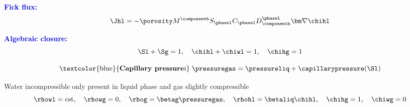 \documentclass[10 pt]{beamer}
\begin{document}
\begin{frame}
\begin{minipage}{.6\linewidth}
   \end{minipage}
\begin{minipage}{.3\linewidth}
\textcolor{blue}{\textbf {Fick flux:}}
\begin{equation*}
\Jhl = -\porosity M^{\componenth} S_{\phasel} C_{\phasel} D_{\componenth}^{\phasel} {\bm \nabla} \chihl
\end{equation*}
\end{minipage}
\hfill
\begin{minipage}{.6\linewidth}
\hspace{2 cm} \textcolor{blue}{\textbf {Algebraic closure:}}
 \begin{equation*}
\Sl + \Sg = 1, \quad \chihl + \chiwl = 1, \quad \chihg = 1
\end{equation*}
\end{minipage}
\vspace{0.2 cm}
\begin{equation*}
\mbox{\textcolor{blue}{\textbf{Capillary pressure:}}}\; \pressuregas = \pressureliq + \capillarypressure(\Sl)
\vspace{-0.5 cm}
\end{equation*}
\pause
\begin{assumption} 
Water incompressible only present in liquid phase and gas slightly compressible
\begin{equation*}
\rhowl = \mathrm{cst}, \quad \rhowg = 0, \quad \rhog = \betag \pressuregas, \quad \rhohl = \betaliq \chihl, \quad \chihg = 1, \quad \chiwg=0
\end{equation*}
\end{assumption}
\end{frame}
\end{document}
